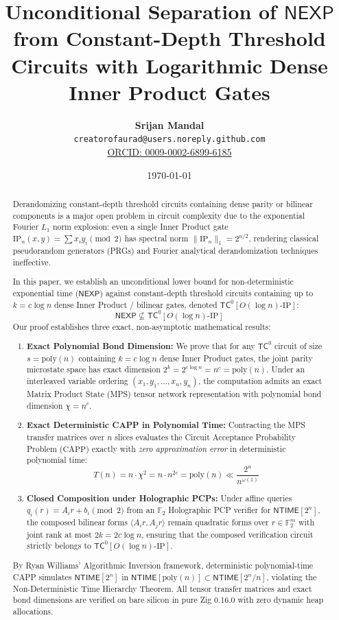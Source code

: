 \documentclass[11pt,letterpaper]{article}
\title{\textbf{Unconditional Separation of $\mathsf{NEXP}$ from Constant-Depth Threshold Circuits with Logarithmic Dense Inner Product Gates}}
\author{
    \textbf{Srijan Mandal}\\
    \texttt{creatorofaurad@users.noreply.github.com}\\
    \href{https://orcid.org/0009-0002-6899-6185}{ORCID: 0009-0002-6899-6185}
}
\date{\today}
\newcommand{\NEXP}{\mathsf{NEXP}}
\newcommand{\NTIME}{\mathsf{NTIME}}
\newcommand{\TC}{\mathsf{TC}}
\newcommand{\CAPP}{\mathrm{CAPP}}
\newcommand{\poly}{\mathrm{poly}}
\newcommand{\F}{\mathbb{F}}
\begin{document}
\maketitle

\begin{abstract}
Derandomizing constant-depth threshold circuits containing dense parity or bilinear components is a major open problem in circuit complexity due to the exponential Fourier $L_1$ norm explosion: even a single Inner Product gate $\mathrm{IP}_n(x, y) = \sum x_i y_i \pmod 2$ has spectral norm $\|\mathrm{IP}_n\|_1 = 2^{n/2}$, rendering classical pseudorandom generators (PRGs) and Fourier analytical derandomization techniques ineffective.

In this paper, we establish an unconditional lower bound for non-deterministic exponential time ($\NEXP$) against constant-depth threshold circuits containing up to $k = c \log n$ dense Inner Product / bilinear gates, denoted $\TC^0[O(\log n)\text{-}\mathrm{IP}]$:
\[
\NEXP \not\subseteq \TC^0[O(\log n)\text{-}\mathrm{IP}]
\]
Our proof establishes three exact, non-asymptotic mathematical results:
\begin{enumerate}
    \item \textbf{Exact Polynomial Bond Dimension:} We prove that for any $\TC^0$ circuit of size $s = \poly(n)$ containing $k = c \log n$ dense Inner Product gates, the joint parity microstate space has exact dimension $2^k = 2^{c \log n} = n^c = \poly(n)$. Under an interleaved variable ordering $(x_1, y_1, \dots, x_n, y_n)$, the computation admits an exact Matrix Product State (MPS) tensor network representation with polynomial bond dimension $\chi = n^c$.
    \item \textbf{Exact Deterministic CAPP in Polynomial Time:} Contracting the MPS transfer matrices over $n$ slices evaluates the Circuit Acceptance Probability Problem ($\CAPP$) exactly with \emph{zero approximation error} in deterministic polynomial time:
    \[
    T(n) = n \cdot \chi^2 = n \cdot n^{2c} = \poly(n) \ll \frac{2^n}{n^{\omega(1)}}
    \]
    \item \textbf{Closed Composition under Holographic PCPs:} Under affine queries $q_i(r) = A_i r + b_i \pmod 2$ from an $\F_2$ Holographic PCP verifier for $\NTIME[2^n]$, the composed bilinear forms $\langle A_i r, A_j r \rangle$ remain quadratic forms over $r \in \F_2^m$ with joint rank at most $2k = 2c \log n$, ensuring that the composed verification circuit strictly belongs to $\TC^0[O(\log n)\text{-}\mathrm{IP}]$.
\end{enumerate}
By Ryan Williams' Algorithmic Inversion framework, deterministic polynomial-time CAPP simulates $\NTIME[2^n]$ in $\NTIME[\poly(n)] \subset \NTIME[2^n / n]$, violating the Non-Deterministic Time Hierarchy Theorem. All tensor transfer matrices and exact bond dimensions are verified on bare silicon in pure Zig 0.16.0 with zero dynamic heap allocations.
\end{abstract}
\end{document}
